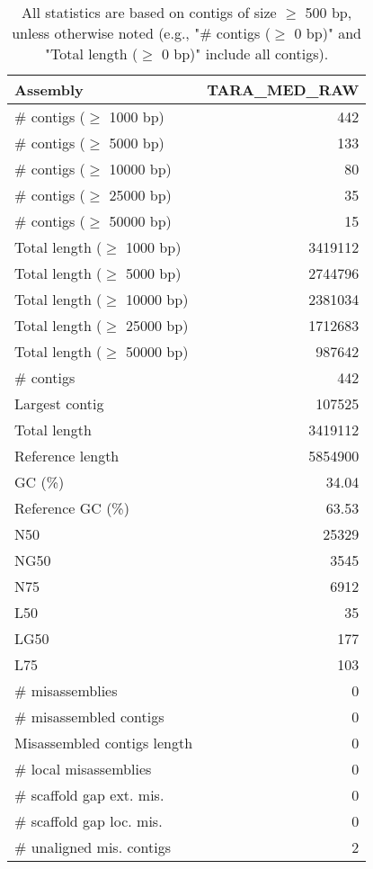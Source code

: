 \documentclass[12pt,a4paper]{article}
\begin{document}
\begin{table}[ht]
\begin{center}
\caption{All statistics are based on contigs of size $\geq$ 500 bp, unless otherwise noted (e.g., "\# contigs ($\geq$ 0 bp)" and "Total length ($\geq$ 0 bp)" include all contigs).}
\begin{tabular}{|l*{1}{|r}|}
\hline
Assembly & TARA\_MED\_RAW \\ \hline
\# contigs ($\geq$ 1000 bp) & 442 \\ \hline
\# contigs ($\geq$ 5000 bp) & 133 \\ \hline
\# contigs ($\geq$ 10000 bp) & 80 \\ \hline
\# contigs ($\geq$ 25000 bp) & 35 \\ \hline
\# contigs ($\geq$ 50000 bp) & 15 \\ \hline
Total length ($\geq$ 1000 bp) & 3419112 \\ \hline
Total length ($\geq$ 5000 bp) & 2744796 \\ \hline
Total length ($\geq$ 10000 bp) & 2381034 \\ \hline
Total length ($\geq$ 25000 bp) & 1712683 \\ \hline
Total length ($\geq$ 50000 bp) & 987642 \\ \hline
\# contigs & 442 \\ \hline
Largest contig & 107525 \\ \hline
Total length & 3419112 \\ \hline
Reference length & 5854900 \\ \hline
GC (\%) & 34.04 \\ \hline
Reference GC (\%) & 63.53 \\ \hline
N50 & 25329 \\ \hline
NG50 & 3545 \\ \hline
N75 & 6912 \\ \hline
L50 & 35 \\ \hline
LG50 & 177 \\ \hline
L75 & 103 \\ \hline
\# misassemblies & 0 \\ \hline
\# misassembled contigs & 0 \\ \hline
Misassembled contigs length & 0 \\ \hline
\# local misassemblies & 0 \\ \hline
\# scaffold gap ext. mis. & 0 \\ \hline
\# scaffold gap loc. mis. & 0 \\ \hline
\# unaligned mis. contigs & 2 \\ \hline

\end{tabular}
\end{center}
\end{table}
\end{document}
